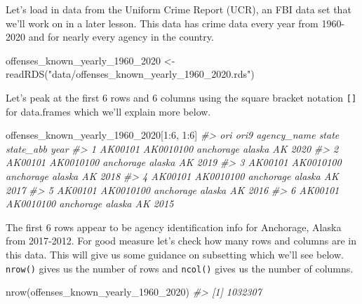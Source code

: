 \documentclass[
]{krantz}
\makeatletter
\newenvironment{Shaded}{\begin{snugshade}}{\end{snugshade}}
\newcommand{\CommentTok}[1]{\textcolor[rgb]{0.37,0.37,0.37}{\textit{#1}}}
\newcommand{\DecValTok}[1]{\textcolor[rgb]{0.06,0.06,0.06}{#1}}
\newcommand{\FunctionTok}[1]{\textcolor[rgb]{0,0,0}{#1}}
\newcommand{\NormalTok}[1]{#1}
\newcommand{\OtherTok}[1]{\textcolor[rgb]{0.37,0.37,0.37}{#1}}
\newcommand{\SpecialCharTok}[1]{\textcolor[rgb]{0,0,0}{#1}}
\newcommand{\StringTok}[1]{\textcolor[rgb]{0.5,0.5,0.5}{#1}}
\newenvironment{kframe}{%
\medskip{}
\setlength{\fboxsep}{.8em}
 \def\at@end@of@kframe{}%
 \ifinner\ifhmode%
  \def\at@end@of@kframe{\end{minipage}}%
  \begin{minipage}{\columnwidth}%
 \fi\fi%
 \def\FrameCommand##1{\hskip\@totalleftmargin \hskip-\fboxsep
 \colorbox{shadecolor}{##1}\hskip-\fboxsep
     \hskip-\linewidth \hskip-\@totalleftmargin \hskip\columnwidth}%
 \MakeFramed {\advance\hsize-\width
   \@totalleftmargin\z@ \linewidth\hsize
   \@setminipage}}%
 {\par\unskip\endMakeFramed%
 \at@end@of@kframe}
\renewenvironment{Shaded}{\begin{kframe}}{\end{kframe}}
\makeatother
\begin{document}
Let's load in data from the Uniform Crime Report (UCR), an FBI data set that we'll work on in a later lesson. This data has crime data every year from 1960-2020 and for nearly every agency in the country.

\begin{Shaded}
\begin{Highlighting}[]
\NormalTok{offenses\_known\_yearly\_1960\_2020 }\OtherTok{\textless{}{-}} \FunctionTok{readRDS}\NormalTok{(}\StringTok{"data/offenses\_known\_yearly\_1960\_2020.rds"}\NormalTok{)}
\end{Highlighting}
\end{Shaded}

Let's peak at the first 6 rows and 6 columns using the square bracket notation \texttt{{[}{]}} for data.frames which we'll explain more below.

\begin{Shaded}
\begin{Highlighting}[]
\NormalTok{offenses\_known\_yearly\_1960\_2020[}\DecValTok{1}\SpecialCharTok{:}\DecValTok{6}\NormalTok{, }\DecValTok{1}\SpecialCharTok{:}\DecValTok{6}\NormalTok{]}
\CommentTok{\#\textgreater{}       ori      ori9 agency\_name  state state\_abb year}
\CommentTok{\#\textgreater{} 1 AK00101 AK0010100   anchorage alaska        AK 2020}
\CommentTok{\#\textgreater{} 2 AK00101 AK0010100   anchorage alaska        AK 2019}
\CommentTok{\#\textgreater{} 3 AK00101 AK0010100   anchorage alaska        AK 2018}
\CommentTok{\#\textgreater{} 4 AK00101 AK0010100   anchorage alaska        AK 2017}
\CommentTok{\#\textgreater{} 5 AK00101 AK0010100   anchorage alaska        AK 2016}
\CommentTok{\#\textgreater{} 6 AK00101 AK0010100   anchorage alaska        AK 2015}
\end{Highlighting}
\end{Shaded}

The first 6 rows appear to be agency identification info for Anchorage, Alaska from 2017-2012. For good measure let's check how many rows and columns are in this data. This will give us some guidance on subsetting which we'll see below. \texttt{nrow()} gives us the number of rows and \texttt{ncol()} gives us the number of columns.

\begin{Shaded}
\begin{Highlighting}[]
\FunctionTok{nrow}\NormalTok{(offenses\_known\_yearly\_1960\_2020)}
\CommentTok{\#\textgreater{} [1] 1032307}
\end{Highlighting}
\end{Shaded}
\end{document}
